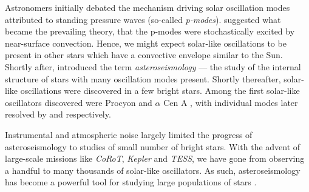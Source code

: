 Astronomers initially debated the mechanism driving solar oscillation modes attributed to standing pressure waves (so-called \emph{p-modes}). \citet{Goldreich.Keeley1977} suggested what became the prevailing theory, that the p-modes were stochastically excited by near-surface convection. Hence, we might expect solar-like oscillations to be present in other stars which have a convective envelope similar to the Sun. Shortly after, \citet{Christensen-Dalsgaard1984} introduced the term \emph{asteroseismology} --- the study of the internal structure of stars with many oscillation modes present.  Shortly thereafter, solar-like oscillations were discovered in a few bright stars. Among the first solar-like oscillators discovered were Procyon and \(\alpha\) Cen A \citep{Gelly.Grec.ea1986}, with individual modes later resolved by \citet{Martic.Schmitt.ea1999} and \citet{Bouchy.Carrier2001} respectively.


Instrumental and atmospheric noise largely limited the progress of asteroseismology to studies of small number of bright stars. With the advent of large-scale missions like \emph{CoRoT}, \emph{Kepler} and \emph{TESS}, we have gone from observing a handful to many thousands of solar-like oscillators. As such, asteroseismology has become a powerful tool for studying large populations of stars \citep[e.g.][]{Serenelli.Johnson.ea2017,Pinsonneault.Elsworth.ea2018}.


